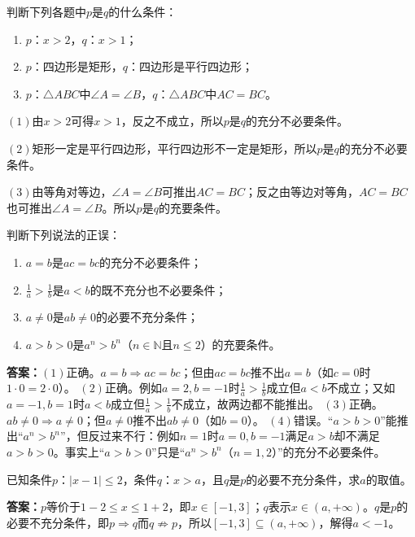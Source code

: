 \begin{example}
判断下列各题中$p$是$q$的什么条件：
\begin{enumerate}
    \item $p$：$x>2$，$q$：$x>1$；
    \item $p$：四边形是矩形，$q$：四边形是平行四边形；
    \item $p$：$\triangle ABC$中$\angle A=\angle B$，$q$：$\triangle ABC$中$AC=BC$。
\end{enumerate}
\end{example}
\begin{jie}
    $(1)$由$x>2$可得$x>1$，反之不成立，所以$p$是$q$的充分不必要条件。

    $(2)$矩形一定是平行四边形，平行四边形不一定是矩形，所以$p$是$q$的充分不必要条件。

    $(3)$由等角对等边，$\angle A=\angle B$可推出$AC=BC$；反之由等边对等角，$AC=BC$也可推出$\angle A=\angle B$。所以$p$是$q$的充要条件。
\end{jie}

\begin{exercise}
判断下列说法的正误：
\begin{enumerate}
    \item $a=b$是$ac=bc$的充分不必要条件；
    \item $\frac{1}{a}>\frac{1}{b}$是$a<b$的既不充分也不必要条件；
    \item $a\neq 0$是$ab\neq 0$的必要不充分条件；
    \item $a>b>0$是$a^n>b^n$（$n\in\mathbb{N}$且$n\leq 2$）的充要条件。
\end{enumerate}
\end{exercise}
\textbf{答案：}$(1)$正确。$a=b\Rightarrow ac=bc$；但由$ac=bc$推不出$a=b$（如$c=0$时$1\cdot 0=2\cdot 0$）。
$(2)$正确。例如$a=2,b=-1$时$\frac{1}{a}>\frac{1}{b}$成立但$a<b$不成立；又如$a=-1,b=1$时$a<b$成立但$\frac{1}{a}>\frac{1}{b}$不成立，故两边都不能推出。
$(3)$正确。$ab\neq 0\Rightarrow a\neq 0$；但$a\neq 0$推不出$ab\neq 0$（如$b=0$）。
$(4)$错误。“$a>b>0$”能推出“$a^n>b^n$”，但反过来不行：例如$n=1$时$a=0,b=-1$满足$a>b$却不满足$a>b>0$。事实上“$a>b>0$”只是“$a^n>b^n$（$n=1,2$）”的充分不必要条件。

\begin{exercise}
已知条件$p$：$|x-1|\leq 2$，条件$q$：$x>a$，且$q$是$p$的必要不充分条件，求$a$的取值。
\end{exercise}
\textbf{答案：}$p$等价于$1-2\leq x\leq 1+2$，即$x\in[-1,3]$；$q$表示$x\in(a,+\infty)$。$q$是$p$的必要不充分条件，即$p\Rightarrow q$而$q\not\Rightarrow p$，所以$[-1,3]\subseteq(a,+\infty)$，解得$a<-1$。

